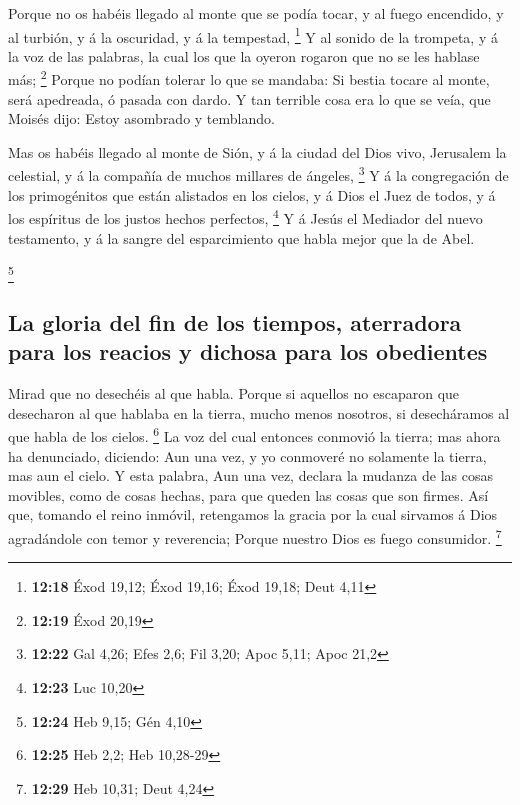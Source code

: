  Porque no os habéis llegado al monte que se podía tocar, y
al fuego encendido, y al turbión, y á la oscuridad, y á la tempestad,
\footnote{\textbf{12:18} Éxod 19,12; Éxod 19,16; Éxod 19,18; Deut 4,11}
 Y al sonido de la trompeta, y á la voz de las palabras, la
cual los que la oyeron rogaron que no se les hablase más; \footnote{\textbf{12:19}
  Éxod 20,19}  Porque no podían tolerar lo que se mandaba:
Si bestia tocare al monte, será apedreada, ó pasada con dardo.
 Y tan terrible cosa era lo que se veía, que Moisés dijo:
Estoy asombrado y temblando.

 Mas os habéis llegado al monte de Sión, y á la ciudad del
Dios vivo, Jerusalem la celestial, y á la compañía de muchos millares de
ángeles, \footnote{\textbf{12:22} Gal 4,26; Efes 2,6; Fil 3,20; Apoc
  5,11; Apoc 21,2}  Y á la congregación de los primogénitos
que están alistados en los cielos, y á Dios el Juez de todos, y á los
espíritus de los justos hechos perfectos, \footnote{\textbf{12:23} Luc
  10,20}  Y á Jesús el Mediador del nuevo testamento, y á
la sangre del esparcimiento que habla mejor que la de Abel.

\footnote{\textbf{12:24} Heb 9,15; Gén 4,10}

\hypertarget{la-gloria-del-fin-de-los-tiempos-aterradora-para-los-reacios-y-dichosa-para-los-obedientes}{%
\subsection{La gloria del fin de los tiempos, aterradora para los
reacios y dichosa para los
obedientes}\label{la-gloria-del-fin-de-los-tiempos-aterradora-para-los-reacios-y-dichosa-para-los-obedientes}}

 Mirad que no desechéis al que habla. Porque si aquellos no
escaparon que desecharon al que hablaba en la tierra, mucho menos
nosotros, si desecháramos al que habla de los cielos. \footnote{\textbf{12:25}
  Heb 2,2; Heb 10,28-29}  La voz del cual entonces conmovió
la tierra; mas ahora ha denunciado, diciendo: Aun una vez, y yo
conmoveré no solamente la tierra, mas aun el cielo.  Y esta
palabra, Aun una vez, declara la mudanza de las cosas movibles, como de
cosas hechas, para que queden las cosas que son firmes. 
Así que, tomando el reino inmóvil, retengamos la gracia por la cual
sirvamos á Dios agradándole con temor y reverencia;  Porque
nuestro Dios es fuego consumidor. \footnote{\textbf{12:29} Heb 10,31;
  Deut 4,24}

